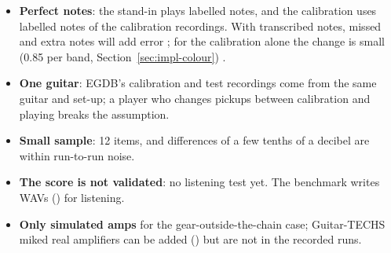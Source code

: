 \begin{caution}
\begin{itemize}
\item \textbf{Perfect notes}: the stand-in plays labelled notes, and the
  calibration uses labelled notes of the calibration recordings. With
  transcribed notes, missed and extra notes will add error \expected; for the
  calibration alone the change is small (0.85\dB{} per band,
  Section~\ref{sec:impl-colour}) \measured.
\item \textbf{One guitar}: EGDB's calibration and test recordings come from the
  same guitar and set-up; a player who changes pickups between calibration and
  playing breaks the assumption.
\item \textbf{Small sample}: 12 items, and differences of a few tenths of a
  decibel are within run-to-run noise.
\item \textbf{The score is not validated}: no listening test yet. The benchmark
  writes WAVs () for listening.
\item \textbf{Only simulated amps} for the gear-outside-the-chain case;
  Guitar-TECHS miked real amplifiers can be added () but
  are not in the recorded runs.
\end{itemize}
\end{caution}
